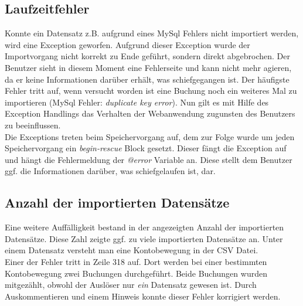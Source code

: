 \documentclass[12pt,             %
               a4paper,          %
               listof=totoc,     %
               index=totoc,      %
               bibliography=totoc,%
               oneside,         %
               BCOR1cm,          %
               english   %
               ]{scrbook}
\begin{document}
\subsection{Laufzeitfehler}
Konnte ein Datensatz z.B. aufgrund eines MySql Fehlers nicht importiert werden, wird eine Exception geworfen. Aufgrund dieser Exception wurde der Importvorgang nicht korrekt zu Ende geführt, sondern direkt abgebrochen. Der Benutzer sieht in diesem Moment eine Fehlerseite und kann nicht mehr agieren, da er keine Informationen darüber erhält, was schiefgegangen ist. Der häufigste Fehler tritt auf, wenn versucht worden ist eine Buchung noch ein weiteres Mal zu importieren (MySql Fehler: \textit{duplicate key error}). Nun gilt es mit Hilfe des Exception Handlings das Verhalten der Webanwendung zugunsten des Benutzers zu beeinflussen.\\

Die Exceptions treten beim Speichervorgang auf, dem zur Folge wurde um jeden Speichervorgang ein \textit{begin-rescue} Block gesetzt. Dieser fängt die Exception auf und hängt die Fehlermeldung der \textit{@error} Variable an. Diese stellt dem Benutzer ggf. die Informationen darüber, was schiefgelaufen ist, dar.\\

\label{listing:webimport_nil}


\subsection{Anzahl der importierten Datensätze}
Eine weitere Auffälligkeit bestand in der angezeigten Anzahl der importierten Datensätze. Diese Zahl zeigte ggf. zu viele importierten Datensätze an. Unter einem Datensatz versteht man eine Kontobewegung in der CSV Datei.\\

Einer der Fehler tritt in Zeile 318 auf. Dort werden bei einer bestimmten Kontobewegung zwei Buchungen durchgeführt. Beide Buchungen wurden mitgezählt, obwohl der Auslöser nur \textit{ein} Datensatz gewesen ist. Durch Auskommentieren und einem Hinweis konnte dieser Fehler korrigiert werden.\\

\label{listing:webimport_nil}
\end{document}

